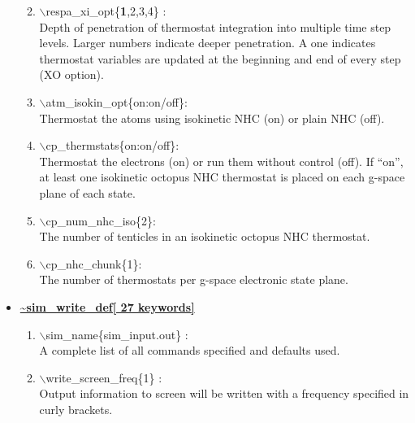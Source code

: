 \documentclass[12pt]{article}
\begin{document}
\begin{itemize}
\begin{enumerate}
 \vspace{0.15in}\Large
 \item   $\backslash$respa\_xi\_opt\{{\bf 1},2,3,4\} : \\
 \large
   Depth of penetration of thermostat integration into multiple time step
   levels.  Larger numbers indicate deeper penetration.  A one indicates
   thermostat variables are updated at the beginning and end of 
   every step (XO option).

 \vspace{0.15in}\Large
 \item   $\backslash$atm\_isokin\_opt\{on:on/off\}: \\ \large
    Thermostat the atoms using isokinetic NHC (on) or plain NHC (off).

 \vspace{0.15in}\Large
 \item   $\backslash$cp\_thermstats\{on:on/off\}: \\ \large
    Thermostat the electrons (on) or run them without control (off).
    If ``on'', at least one isokinetic octopus NHC thermostat is placed on each
    g-space plane of each state.

 \vspace{0.15in}\Large
 \item   $\backslash$cp\_num\_nhc\_iso\{2\}: \\ \large
    The number of tenticles in an isokinetic octopus NHC thermostat.

 \vspace{0.15in}\Large
 \item   $\backslash$cp\_nhc\_chunk\{1\}: \\ \large
    The number of thermostats per g-space electronic state plane.
\end{enumerate}

\clearpage
\huge
\item[] \underline{\bf \~{}sim\_write\_def[ 27 keywords]}
\begin{enumerate}

 \vspace{0.15in} \Large
 \item   $\backslash$sim\_name\{sim\_input.out\} : \\
    A complete list of all commands specified and defaults used.

 \vspace{0.15in} \Large
 \item   $\backslash$write\_screen\_freq\{1\} : \\
  \large
   Output information to screen will be written with a frequency specified
   in curly brackets.


\end{enumerate}
\end{itemize}
\end{document}
